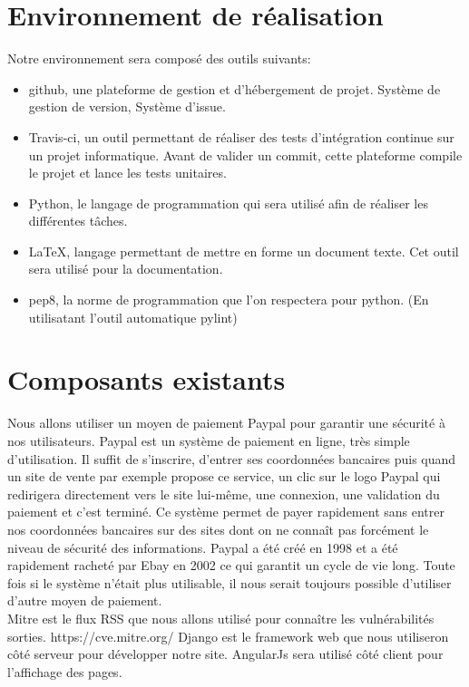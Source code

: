 \section{Environnement de réalisation}
Notre environnement sera composé des outils suivants:\\
\begin{itemize}
\item github, une plateforme de gestion et d'hébergement de projet. Système de gestion de version, Système d’issue.
\item Travis-ci, un outil permettant de réaliser des tests d’intégration continue sur un projet informatique. Avant de valider un commit, cette plateforme compile le projet et lance les tests unitaires.\\
\item Python, le langage de programmation qui sera utilisé afin de réaliser les différentes tâches.\\
\item LaTeX, langage permettant de mettre en forme un document texte. Cet outil sera utilisé pour la documentation.\\
\item pep8, la norme de programmation que l’on respectera pour python. (En utilisatant l'outil automatique pylint)\\
\end{itemize}

\section{Composants existants}
Nous allons utiliser un moyen de paiement Paypal pour garantir une sécurité à nos utilisateurs. Paypal est un système de paiement en ligne, très simple d’utilisation. Il suffit de s’inscrire, d’entrer ses coordonnées bancaires puis quand un site de vente par exemple propose ce service, un clic sur le logo Paypal qui redirigera directement vers le site lui-même, une connexion, une validation du paiement et c’est terminé. Ce système permet de payer rapidement sans entrer nos coordonnées bancaires sur des sites dont on ne connaît pas forcément le niveau de sécurité des informations. Paypal a été créé en 1998 et a été rapidement racheté par Ebay en 2002 ce qui garantit un cycle de vie long. Toute fois si le système n’était plus utilisable, il nous serait toujours possible d’utiliser d’autre moyen de paiement.\\
Mitre est le flux RSS que nous allons utilisé pour connaître les vulnérabilités sorties. https://cve.mitre.org/
Django est le framework web que nous utiliseron côté serveur pour développer notre site.
AngularJs sera utilisé côté client pour l'affichage des pages.

